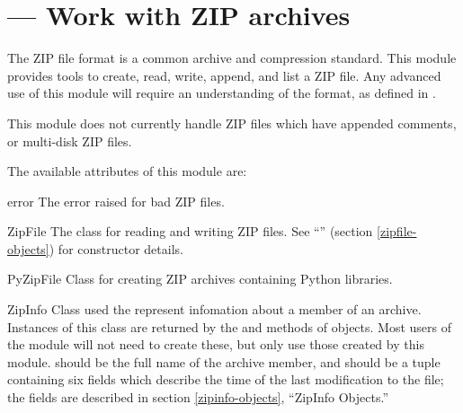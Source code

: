 \section{ ---
         Work with ZIP archives}



The ZIP file format is a common archive and compression standard.
This module provides tools to create, read, write, append, and list a
ZIP file.  Any advanced use of this module will require an
understanding of the format, as defined in
.

This module does not currently handle ZIP files which have appended
comments, or multi-disk ZIP files.

The available attributes of this module are:

\begin{excdesc}{error}
  The error raised for bad ZIP files.
\end{excdesc}

\begin{classdesc}{ZipFile}{\unspecified}
  The class for reading and writing ZIP files.  See
  ``'' (section \ref{zipfile-objects}) for
  constructor details.
\end{classdesc}

\begin{classdesc}{PyZipFile}{\unspecified}
  Class for creating ZIP archives containing Python libraries.
\end{classdesc}

\begin{classdesc}{ZipInfo}{}
  Class used the represent infomation about a member of an archive.
  Instances of this class are returned by the  and
   methods of  objects.  Most users
  of the  module will not need to create these, but
  only use those created by this module.
   should be the full name of the archive member, and
   should be a tuple containing six fields which
  describe the time of the last modification to the file; the fields
  are described in section \ref{zipinfo-objects}, ``ZipInfo Objects.''
\end{classdesc}

